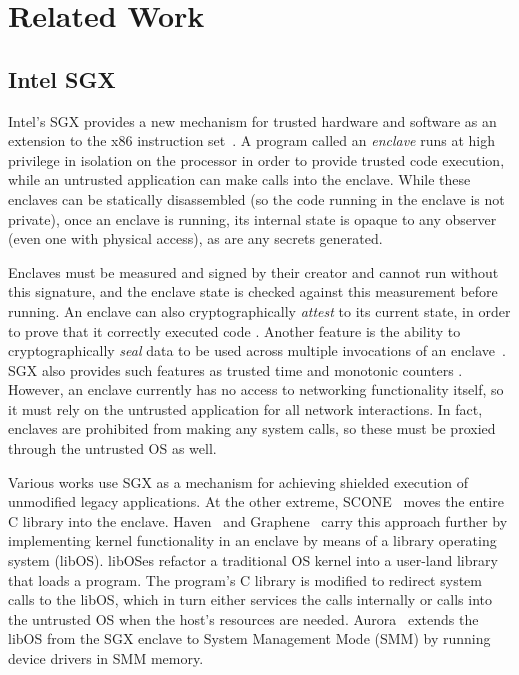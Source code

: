 \section{Related Work}
\label{sec:related}

\subsection{Intel SGX}

Intel's SGX provides a new mechanism for trusted hardware and software as an
extension to the x86 instruction set~\cite{sgx, mckeen2013innovative}.  
%
A program called an \textit{enclave} runs at high privilege in isolation on the
processor in order to provide trusted code execution, while an untrusted
application can make calls into the enclave.
%
While these enclaves can be statically disassembled (so the code running in the
enclave is not private), once an enclave is running, its internal state
is opaque to any observer (even one with physical access), as are any secrets
generated.  


Enclaves must be measured and signed by their creator and cannot run without
this signature, and the enclave state is checked against this measurement
before running.  
%
An enclave can also cryptographically \textit{attest} to its current state, in
order to prove that it correctly executed code \cite{sgx_provisioning,
anati2013innovative}.  
%
Another feature is the ability to cryptographically \textit{seal} data to be
used across multiple invocations of an enclave~\cite{anati2013innovative,
sgx_sealing}.  
%
SGX also provides such features as trusted time and monotonic counters
\cite{sgx-linux-sdk,sgx-trusted-time}.  
%
However, an enclave currently has no access to networking functionality itself,
so it must rely on the untrusted application for all network interactions.  
%
In fact, enclaves are prohibited from making any system calls, so these must be
proxied through the untrusted OS as well.


%
Various works use SGX as a mechanism for achieving shielded execution of
unmodified legacy applications.
%
At the other extreme, SCONE~\cite{scone} moves the entire C library into the enclave.
%
Haven~\cite{haven} and Graphene~\cite{graphene} carry this approach further by
implementing kernel functionality in an enclave by means of a library operating
system (libOS).
libOSes refactor a traditional OS kernel into a user-land library that loads a
program.
%
The program's C library is modified to redirect system calls to the libOS, which
in turn either services the calls internally or calls into the untrusted OS
when the host's resources are needed.
%
Aurora~\cite{liang2018aurora} extends the libOS from the SGX enclave to System
Management Mode (SMM) by running device drivers in SMM memory.


